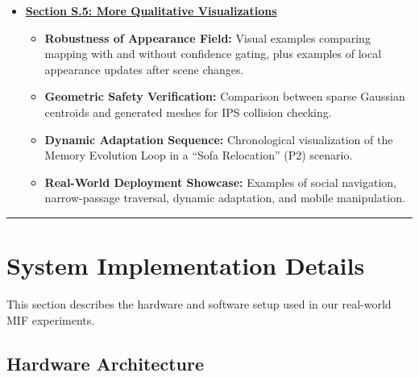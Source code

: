 \documentclass[conference]{IEEEtran}
\begin{document}
\begin{strip}
\begin{center}
\begin{minipage}{0.96\textwidth}
\begin{itemize}
    \item \textbf{\hyperref[sec:qualitative_results]{Section S.5: More Qualitative Visualizations}}
    \begin{itemize} \setlength{\itemsep}{1pt} \setlength{\topsep}{0pt} \small
        \item \textbf{Robustness of Appearance Field:} Visual examples comparing mapping with and without confidence gating, plus examples of local appearance updates after scene changes.
        \item \textbf{Geometric Safety Verification:} Comparison between sparse Gaussian centroids and generated meshes for IPS collision checking.
        \item \textbf{Dynamic Adaptation Sequence:} Chronological visualization of the Memory Evolution Loop in a ``Sofa Relocation'' (P2) scenario.
        \item \textbf{Real-World Deployment Showcase:} Examples of social navigation, narrow-passage traversal, dynamic adaptation, and mobile manipulation.
    \end{itemize}
\end{itemize}
\end{minipage}

\vspace{0.3cm}
\hrule
\vspace{0.8cm}

\end{center}
\end{strip}


\setcounter{section}{0}
\setcounter{equation}{0}
\setcounter{figure}{0}
\setcounter{table}{0}
\setcounter{page}{1}

\renewcommand{\thesection}{S.\arabic{section}}
\renewcommand{\thesubsection}{S.\arabic{section}-\Alph{subsection}}
\renewcommand{\thetable}{S.\arabic{table}}
\renewcommand{\thefigure}{S.\arabic{figure}}

\clearpage
\section{System Implementation Details}
\label{sec:implementation_details}

This section describes the hardware and software setup used in our real-world MIF experiments.

\subsection{Hardware Architecture}
\end{document}
